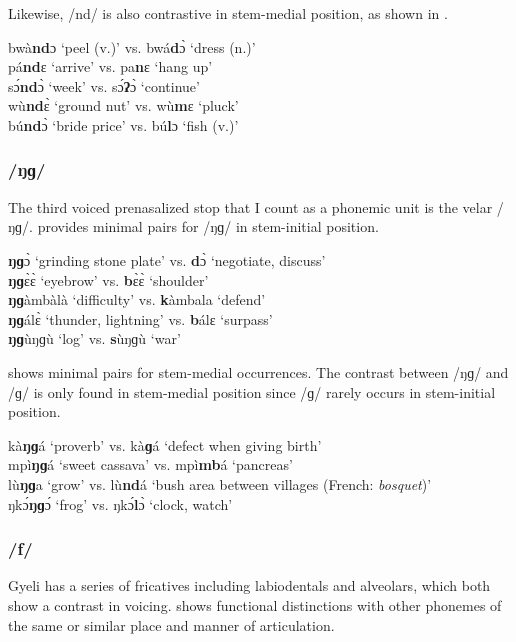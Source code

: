 \noindent Likewise, /nd/ is also contrastive in stem-medial position, as shown in .

\ea \label{ndm}
bwà{\bfseries nd}ɔ `peel (v.)' vs. bwá{\bfseries d}ɔ̀ `dress (n.)' \\
pá{\bfseries nd}ɛ `arrive' vs. pa{\bfseries n}ɛ `hang up' \\
sɔ́{\bfseries nd}ɔ̀ `week' vs. sɔ́{\bfseries ʔ}ɔ̀ `continue' \\
wù{\bfseries nd}ɛ̀ `ground nut' vs. wù{\bfseries m}ɛ `pluck' \\
bú{\bfseries nd}ɔ̀ `bride price' vs. bú{\bfseries l}ɔ `fish (v.)' 
\z


\subsubsection*{\bfseries /ŋɡ/}     The third voiced prenasalized stop that I count as a phonemic unit is the velar /ŋɡ/.  provides minimal pairs for /ŋɡ/ in stem-initial position.


\ea \label{ng}
{\bfseries ŋɡ}ɔ̀ `grinding stone plate' vs. {\bfseries d}ɔ̀ `negotiate, discuss' \\
{\bfseries ŋɡ}ɛ̀ɛ̀ `eyebrow' vs. {\bfseries b}ɛ̀ɛ̀ `shoulder' \\ %
{\bfseries ŋɡ}àmbàlà `difficulty' vs. {\bfseries k}àmbala `defend' \\
{\bfseries ŋɡ}álɛ̀ `thunder, lightning' vs. {\bfseries b}álɛ `surpass' \\
{\bfseries ŋɡ}ùŋɡù `log' vs. {\bfseries s}ùŋɡù `war'
\z

  shows minimal pairs for stem-medial occurrences. The contrast between /ŋɡ/ and /ɡ/ is only found in stem-medial position since /ɡ/ rarely occurs in stem-initial position.

\ea \label{ngm}
kà{\bfseries ŋɡ}á `proverb' vs. kà{\bfseries ɡ}á `defect when giving birth' \\
mpì{\bfseries ŋɡ}á `sweet cassava' vs. mpì{\bfseries mb}á `pancreas' \\
lù{\bfseries ŋɡ}a `grow' vs. lù{\bfseries nd}á `bush area between villages (French: {\itshape bosquet})' \\
ŋkɔ́{\bfseries ŋɡ}ɔ́ `frog' vs. ŋkɔ́{\bfseries l}ɔ̀ `clock, watch' \\
\z







\subsubsection*{\bfseries /f/} Gyeli has a series of fricatives including labiodentals and alveolars, which both show a contrast in voicing.  shows functional distinctions with other phonemes of the same or similar place and manner of articulation.


